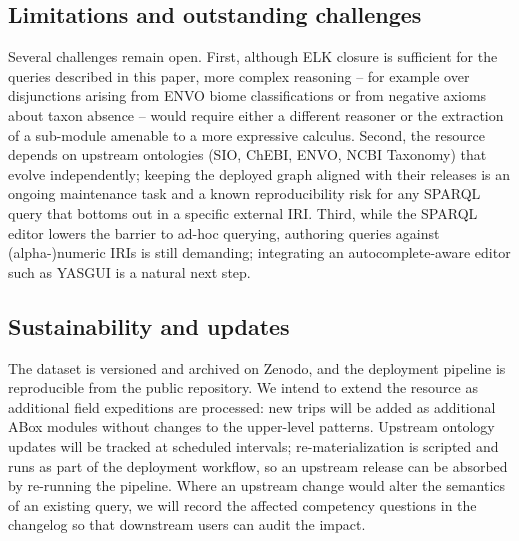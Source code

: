 \subsection{Limitations and outstanding challenges}

Several challenges remain open. First, although ELK closure is
sufficient for the queries described in this paper, more complex
reasoning -- for example over disjunctions arising from ENVO
biome classifications or from negative axioms about taxon
absence -- would require either a different reasoner or the
extraction of a sub-module amenable to a more expressive
calculus. Second, the resource depends on upstream ontologies
(SIO, ChEBI, ENVO, NCBI Taxonomy) that evolve independently;
keeping the deployed graph aligned with their releases is an
ongoing maintenance task and a known reproducibility risk for any
SPARQL query that bottoms out in a specific external IRI. Third,
while the SPARQL editor lowers the barrier to ad-hoc querying,
authoring queries against (alpha-)numeric IRIs is still
demanding; integrating an autocomplete-aware editor such as
YASGUI is a natural next step.

\subsection{Sustainability and updates}

The dataset is versioned and archived on Zenodo, and the
deployment pipeline is reproducible from the public repository.
We intend to extend the resource as additional field expeditions
are processed: new trips will be added as additional ABox
modules without changes to the upper-level patterns. Upstream
ontology updates will be tracked at scheduled intervals;
re-materialization is scripted and runs as part of the
deployment workflow, so an upstream release can be absorbed by
re-running the pipeline. Where an upstream change would alter
the semantics of an existing query, we will record the affected
competency questions in the changelog so that downstream users
can audit the impact.
